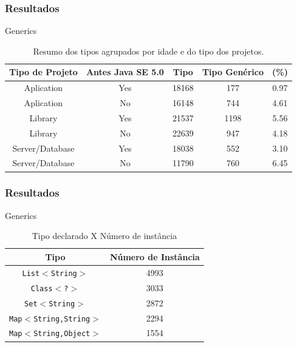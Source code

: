 \documentclass[]{beamer}
\begin{document}
	\begin{frame}[fragile, label=re]\frametitle{Resultados}
		\begin{block}{Generics}
				\begin{table}[h!]\footnotesize
					\centering
					\caption{Resumo dos tipos agrupados por idade e do tipo dos projetos.}
					\begin{tabular}{ccccc} \hline 
						Tipo de Projeto & Antes Java SE 5.0 & Tipo & Tipo Genérico & (\%) \\ \hline\hline
						Aplication & Yes & 18168 & 177 & 0.97 \\
						Aplication & No & 16148 & 744 & 4.61 \\
						Library & Yes & 21537 & 1198 & 5.56 \\
						Library & No & 22639 & 947 & 4.18 \\
						Server/Database & Yes & 18038 & 552 & 3.10 \\ 
						Server/Database & No & 11790 & 760 & 6.45 \\ \hline
					\end{tabular}
					\label{tab:std} %
				\end{table}
	
			\end{block}
		\end{frame}
		
		
	\begin{frame}[fragile, label=re]\frametitle{Resultados}
		\begin{block}{Generics}
			\begin{table}[ht]\footnotesize
				\centering
				\caption{Tipo declarado X Número de instância}
				\begin{tabular}{cc}
					\hline
					Tipo & Número de Instância\\ 
					\hline \hline
					\texttt{List$<$String$>$} & 4993 \\ 
					\texttt{Class$<$?$>$} & 3033 \\ 
					\texttt{Set$<$String$>$} & 2872 \\ 
					\texttt{Map$<$String,String$>$} & 2294 \\ 
					\texttt{Map$ < $String,Object$>$} & 1554 \\ \hline
				\end{tabular}
				\label{tab:tipoXnumeroInstancia} %
			\end{table}
	
			\end{block}
		\end{frame}
\end{document}

